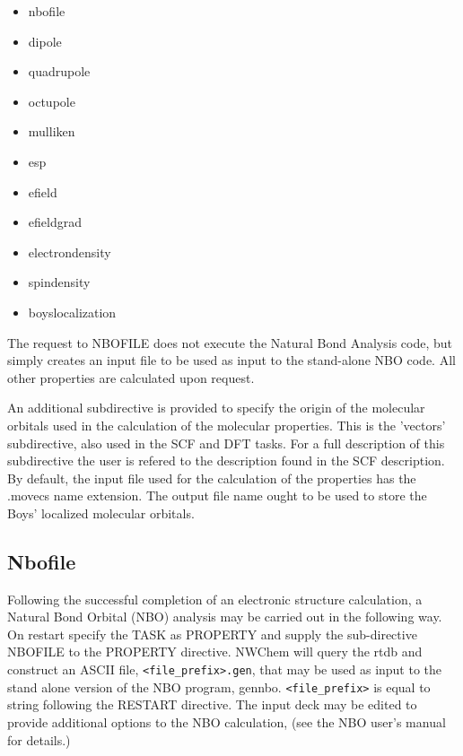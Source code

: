\begin{itemize}
\item nbofile
\item dipole
\item quadrupole
\item octupole
\item mulliken
\item esp
\item efield
\item efieldgrad
\item electrondensity
\item spindensity
\item boyslocalization
\end{itemize}

The request to NBOFILE does not execute the Natural Bond Analysis
code, but simply creates an input file to be used as input to the
stand-alone NBO code. All other properties are calculated upon
request.

An additional subdirective is provided to specify the origin of the
molecular orbitals used in the calculation of the molecular
properties. This is the 'vectors' subdirective, also used in the
SCF and DFT tasks. For a full description of this subdirective
the user is refered to the description found in the SCF description.
By default, the input file used for the calculation of the properties
has the .movecs name extension. The output file name ought to be
used to store the Boys' localized molecular orbitals.

\subsection{Nbofile}

Following the successful completion of an electronic structure
calculation, a Natural Bond Orbital (NBO) analysis may be carried out
in the following way.  On restart specify the TASK as PROPERTY and
supply the sub-directive NBOFILE to the PROPERTY directive.  NWChem
will query the rtdb and construct an ASCII file,
\verb+<file_prefix>.gen+, that may be used as input to the stand alone
version of the NBO program, gennbo.  \verb+<file_prefix>+ is equal to
string following the RESTART directive.  The input deck may be edited
to provide additional options to the NBO calculation, (see the NBO
user's manual for details.)

